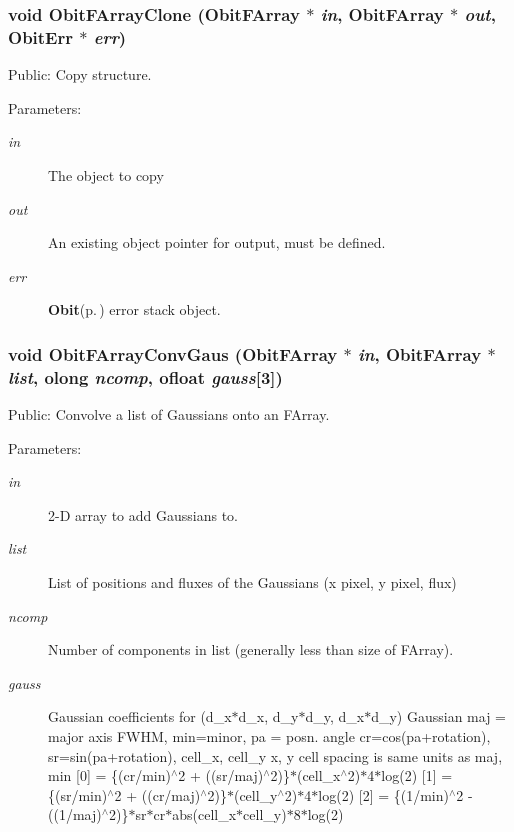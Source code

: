 \subsubsection{\setlength{\rightskip}{0pt plus 5cm}void Obit\-FArray\-Clone ({\bf Obit\-FArray} $\ast$ {\em in}, {\bf Obit\-FArray} $\ast$ {\em out}, {\bf Obit\-Err} $\ast$ {\em err})}\label{ObitFArray_8c_a17}


Public: Copy structure. 

\begin{Desc}
\item[Parameters:]
\begin{description}
\item[{\em in}]The object to copy \item[{\em out}]An existing object pointer for output, must be defined. \item[{\em err}]{\bf Obit}{\rm (p.\,\pageref{structObit})} error stack object. \end{description}
\end{Desc}
\subsubsection{\setlength{\rightskip}{0pt plus 5cm}void Obit\-FArray\-Conv\-Gaus ({\bf Obit\-FArray} $\ast$ {\em in}, {\bf Obit\-FArray} $\ast$ {\em list}, {\bf olong} {\em ncomp}, {\bf ofloat} {\em gauss}[3])}\label{ObitFArray_8c_a66}


Public: Convolve a list of Gaussians onto an FArray. 

\begin{Desc}
\item[Parameters:]
\begin{description}
\item[{\em in}]2-D array to add Gaussians to. \item[{\em list}]List of positions and fluxes of the Gaussians (x pixel, y pixel, flux) \item[{\em ncomp}]Number of components in list (generally less than size of FArray). \item[{\em gauss}]Gaussian coefficients for (d\_\-x$\ast$d\_\-x, d\_\-y$\ast$d\_\-y, d\_\-x$\ast$d\_\-y) Gaussian maj = major axis FWHM, min=minor, pa = posn. angle cr=cos(pa+rotation), sr=sin(pa+rotation), cell\_\-x, cell\_\-y x, y cell spacing is same units as maj, min [0] = \{(cr/min)$^\wedge$2 + ((sr/maj)$^\wedge$2)\}$\ast$(cell\_\-x$^\wedge$2)$\ast$4$\ast$log(2) [1] = \{(sr/min)$^\wedge$2 + ((cr/maj)$^\wedge$2)\}$\ast$(cell\_\-y$^\wedge$2)$\ast$4$\ast$log(2) [2] = \{(1/min)$^\wedge$2 - ((1/maj)$^\wedge$2)\}$\ast$sr$\ast$cr$\ast$abs(cell\_\-x$\ast$cell\_\-y)$\ast$8$\ast$log(2) \end{description}
\end{Desc}
